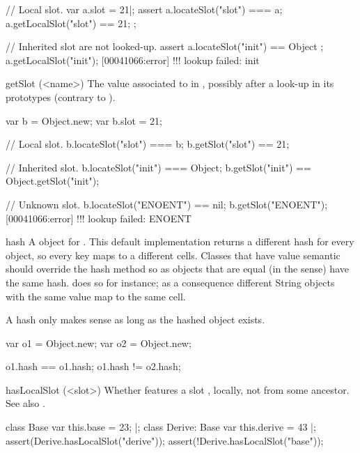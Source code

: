 \begin{urbiscriptapi}
\begin{urbiscript}
// Local slot.
var a.slot = 21|;
assert
{
  a.locateSlot("slot") === a;
  a.getLocalSlot("slot") == 21;
};

// Inherited slot are not looked-up.
assert { a.locateSlot("init") == Object };
a.getLocalSlot("init");
[00041066:error] !!! lookup failed: init
\end{urbiscript}

\item[getSlot](<name>)%
  The value associated to  in \this, possibly after a look-up in
  its prototypes (contrary to ).
\begin{urbiassert}
var b = Object.new;
var b.slot = 21;

// Local slot.
b.locateSlot("slot") === b;
b.getSlot("slot") == 21;

// Inherited slot.
b.locateSlot("init") === Object;
b.getSlot("init") == Object.getSlot("init");

// Unknown slot.
b.locateSlot("ENOENT") == nil;
b.getSlot("ENOENT");
[00041066:error] !!! lookup failed: ENOENT
\end{urbiassert}

\item[hash]%
  A  object for \this.  This default implementation returns
  a different hash for every object, so every key maps to a different
  cells. Classes that have value semantic should override the hash method so
  as objects that are equal (in the  sense) have the
  same hash.  does so for instance; as a consequence
  different String objects with the same value map to the same cell.

  A hash only makes sense as long as the hashed object exists.

\begin{urbiassert}
var o1 = Object.new;
var o2 = Object.new;

o1.hash == o1.hash;
o1.hash != o2.hash;
\end{urbiassert}

\item[hasLocalSlot](<slot>)%
  Whether \this features a slot , locally, not
  from some ancestor.  See also .
\begin{urbiscript}
class Base         { var this.base = 23; } |;
class Derive: Base { var this.derive = 43 } |;
assert(Derive.hasLocalSlot("derive"));
assert(!Derive.hasLocalSlot("base"));
\end{urbiscript}


\end{urbiscriptapi}
